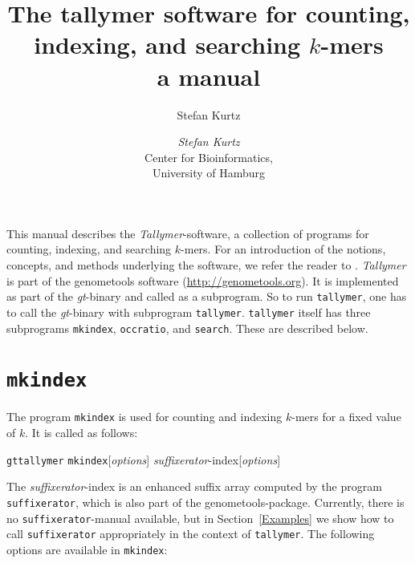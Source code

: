 \documentclass[12pt]{article}
\title{The tallymer software for counting, indexing, and searching $k$-mers\\
a manual}
\author{Stefan Kurtz}
\author{\begin{tabular}{c}
         \textit{Stefan Kurtz}\\
         Center for Bioinformatics,\\
         University of Hamburg
        \end{tabular}}
\newcommand{\Programname}[1]{\texttt{\small #1}}
\newcommand{\Tallymer}[0]{\Programname{tallymer}\xspace}
\newcommand{\TYmkindex}[0]{\Programname{mkindex}\xspace}
\newcommand{\TYsearch}[0]{\Programname{search}\xspace}
\newcommand{\TYoccratio}[0]{\Programname{occratio}\xspace}
\newcommand{\SFX}[0]{\Programname{suffixerator}\xspace}
\newcommand{\SFXidx}[0]{\textit{suffixerator}-index\xspace}
\newcommand{\GT}[0]{\Programname{gt}\xspace}
\newcommand{\Typrogintro}[1]{
\par
\noindent\GT \Programname{tallymer} #1\xspace [\textit{options}] \Showoption{esa}
\SFXidx [\textit{options}]
\par
The \SFXidx is an enhanced suffix array computed by the
program \SFX, which is also part of the genometools-package. Currently, 
there is no \SFX-manual available, but in Section~\ref{Examples} we show how 
to call \SFX appropriately in  the context of
\Tallymer. The following options are available in #1:}
\begin{document}
\maketitle
This manual describes the \textit{Tallymer}-software, a collection of programs
for counting, indexing, and searching $k$-mers. For an introduction of
the notions, concepts, and methods underlying the software, we refer
the reader to \cite{KUR:NER:STE:WAR:2008}. \textit{Tallymer} is part of
the genometools software (\url{http://genometools.org}). It is implemented
as part of the \textit{gt}-binary and called as a subprogram. So to
run \Tallymer, one has to call the \textit{gt}-binary with subprogram
\texttt{tallymer}. \Tallymer itself has three subprograms 
\TYmkindex, \TYoccratio, and \TYsearch. These are described below.

\section{\TYmkindex}
The program \TYmkindex is used for counting and indexing \(k\)-mers for
a fixed value of \(k\). It is called as follows:
\par
\Typrogintro{\TYmkindex}
\end{document}
